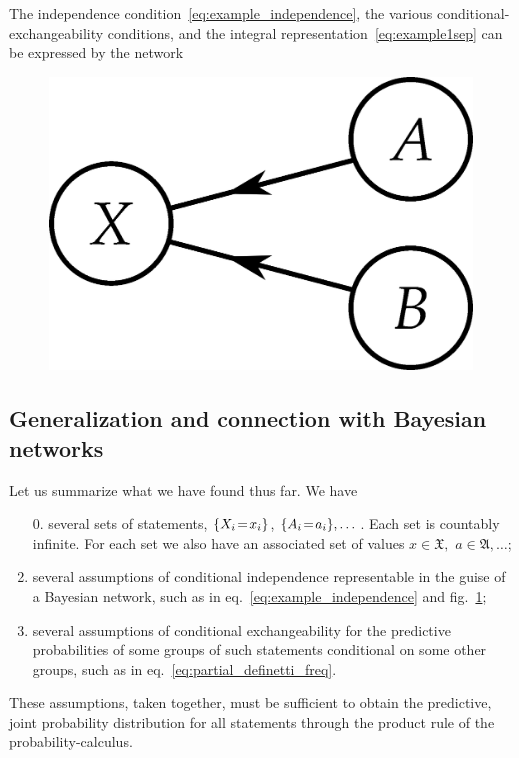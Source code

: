 \documentclass[\ifafour a4paper,12pt,\else a5paper,10pt,\fi%
onecolumn,oneside,article,%
british%
]{memoir}
\theoremstyle{remark}
\theoremstyle{innote}
\DeclarePairedDelimiter\set{\{}{\}}
\renewcommand*{\|}[1][]{\nonscript\,#1\vert\nonscript\,\mathopen{}}
\newcommand*{\eqn}{eq.}%
\newcommand*{\fig}{fig.}%
\renewcommand*{\=}{\TextOrMath\texteq\eq}
\newcommand*{\X}[1]{X_{#1}}
\newcommand*{\x}[1]{x_{#1}}
\newcommand*{\A}[1]{A_{#1}}
\newcommand*{\va}[1]{a_{#1}}
\newcommand*{\sX}{\mathfrak{X}}
\newcommand*{\sA}{\mathfrak{A}}
\begin{document}
The independence condition~\eqref{eq:example_independence}, the various
conditional-exchangeability conditions, and the integral
representation~\eqref{eq:example1sep} can be expressed by the network\\
\begin{figure}[h!]
\centering\includegraphics[scale=0.5]{bayesnet3s.png}
\caption{\label{fig:indep_net}}
\end{figure}%

\subsection{Generalization and connection with Bayesian networks}
\label{sec:graph_repr_gen}

Let us summarize what we have found thus far. We have
\begin{enumerate}[label=\roman*.]
\item[0.] several sets of statements, $\set{\X{i}\=\x{i}}$,
  $\set{\A{i}\=\va{i}},\dotsc$. Each set is countably infinite. For each
  set we also have an associated set of values $x\in \sX,$
  $a \in \sA, \dotsc$;
\item\label{item:assu_bayesnet} several assumptions of conditional independence representable in the
  guise of a Bayesian network, such as in
  \eqn~\eqref{eq:example_independence} and \fig~\ref{fig:indep_net};
\item\label{item:assu_condexch} several assumptions of conditional exchangeability for the predictive
  probabilities of some groups of such statements conditional on some other
  groups, such as in \eqn~\eqref{eq:partial_definetti_freq}.
\end{enumerate}
These assumptions, taken together, must be sufficient to obtain the
predictive, joint probability distribution for all statements through the
product rule of the probability-calculus.
\end{document}
